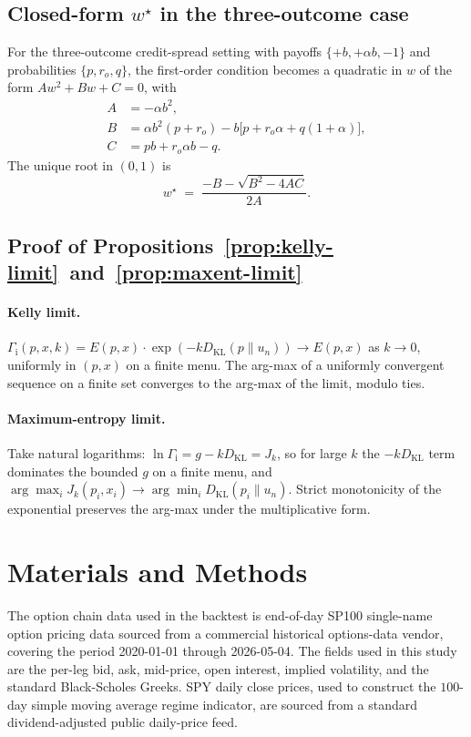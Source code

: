 \documentclass[11pt]{article}
\theoremstyle{definition}
\theoremstyle{remark}
\newcommand{\KL}{D_{\mathrm{KL}}}
\newcommand{\GROUND}{\Gamma_{\mathrm{i}}}
\begin{document}
\subsection{Closed-form \texorpdfstring{$w^\star$}{w-star} in the three-outcome case}

For the three-outcome credit-spread setting with payoffs
$\{+b, +\alpha b, -1\}$ and probabilities $\{p, r_o, q\}$, the
first-order condition becomes a quadratic in $w$ of the form $A w^2
+ B w + C = 0$, with
\begin{align*}
A &= -\alpha b^2, \\
B &= \alpha b^2 (p + r_o) - b \bigl[ p + r_o \alpha + q(1 + \alpha) \bigr], \\
C &= p b + r_o \alpha b - q.
\end{align*}
The unique root in $(0, 1)$ is
\begin{equation*}
w^\star \;=\; \frac{-B - \sqrt{B^2 - 4AC}}{2A}.
\end{equation*}

\subsection{Proof of Propositions~\ref{prop:kelly-limit}~and~\ref{prop:maxent-limit}}

\paragraph{Kelly limit.} $\GROUND(p, x, k) = E(p, x) \cdot \exp(-k
\KL(p \| u_n)) \to E(p, x)$ as $k \to 0$, uniformly in $(p, x)$
on a finite menu. The arg-max of a uniformly convergent sequence
on a finite set converges to the arg-max of the limit, modulo
ties.

\paragraph{Maximum-entropy limit.} Take natural logarithms: $\ln
\GROUND = g - k \KL = J_k$, so for large $k$ the $-k \KL$ term
dominates the bounded $g$ on a finite menu, and $\arg\max_i J_k
(p_i, x_i) \to \arg\min_i \KL(p_i \| u_n)$. Strict monotonicity of
the exponential preserves the arg-max under the multiplicative
form.


\section{Materials and Methods}\label{sec:materials}

The option chain data used in the backtest is end-of-day SP100
single-name option pricing data sourced from a commercial historical
options-data vendor, covering the period 2020-01-01 through
2026-05-04. The fields used in this study are the per-leg bid, ask,
mid-price, open interest, implied volatility, and the standard
Black-Scholes Greeks. SPY daily close prices, used to construct the
$100$-day simple moving average regime indicator, are sourced from a
standard dividend-adjusted public daily-price feed.
\end{document}
